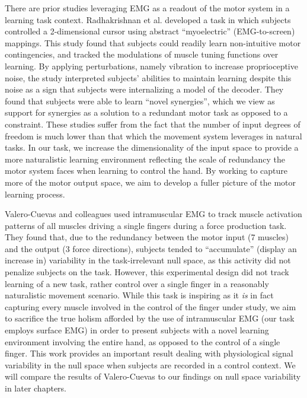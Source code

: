 \documentclass[../main.tex]{subfiles}
\begin{document}
There are prior studies leveraging EMG as a readout of the motor system in a learning task context. Radhakrishnan et al. \cite{radhakrishnanLearningNovelMyoelectricControlled2008,Mussa-IvaldiSensoryMotorRemapping2011} developed a task in which subjects controlled a 2-dimensional cursor using abstract ``myoelectric'' (EMG-to-screen) mappings. This study found that subjects could readily learn non-intuitive motor contingencies, and tracked the modulations of muscle tuning functions over learning. By applying perturbations, namely vibration to increase proprioceptive noise, the study interpreted subjects' abilities to maintain learning despite this noise as a sign that subjects were internalizing a model of the decoder. They found that subjects were able to learn ``novel synergies'', which we view as support for synergies as a solution to a redundant motor task as opposed to a constraint. These studies suffer from the fact that the number of input degrees of freedom is much lower than that which the movement system leverages in natural tasks. In our task, we increase the dimensionality of the input space to provide a more naturalistic learning environment reflecting the scale of redundancy the motor system faces when learning to control the hand. By working to capture more of the motor output space, we aim to develop a fuller picture of the motor learning process.

Valero-Cuevas and colleagues\cite{Valero-Cuevas2009} used intramuscular EMG to track muscle activation patterns of all muscles driving a single fingers during a force production task. They found that, due to the redundancy between the motor input (7 muscles) and the output (3 force directions), subjects tended to ``accumulate'' (display an increase in) variability in the task-irrelevant null space, as this activity did not penalize subjects on the task. However, this experimental design did not track learning of a new task, rather control over a single finger in a reasonably naturalistic movement scenario. While this task is inspiring as it \textit{is} in fact capturing every muscle involved in the control of the finger under study, we aim to sacrifice the true holism afforded by the use of intramuscular EMG (our task employs surface EMG) in order to present subjects with a novel learning environment involving the entire hand, as opposed to the control of a single finger. This work provides an important result dealing with physiological signal variability in the null space when subjects are recorded in a control context. We will compare the results of Valero-Cuevas to our findings on null space variability in later chapters.
\end{document}
